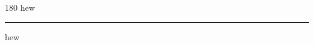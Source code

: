 
\begin{frame}
\begin{center}
\begin{turn}{180}
{\fontsize{2.5cm}{1em}\selectfont hew}
\end{turn}
\vspace{1em}\par  
\hrule
\vspace{1em}\par  
{\fontsize{2.5cm}{1em}\selectfont hew}
\end{center}
\end{frame}
